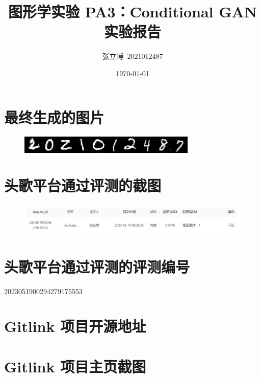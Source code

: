 \documentclass[12pt,a4paper]{article}
\title{\textbf{图形学实验 PA3：Conditional GAN 实验报告}}
\author{张立博\ 2021012487}
\date{\today}
\begin{document}
\maketitle
\section{最终生成的图片}
\begin{figure}[H]
    \centering
    \includegraphics*{result.png}
\end{figure}
\section{头歌平台通过评测的截图}
\begin{figure}[H]
    \centering
    \includegraphics*{evaluate.jpg}
\end{figure}
\section{头歌平台通过评测的评测编号}
2023051900294279175553
\section{Gitlink 项目开源地址}
\section{Gitlink 项目主页截图}
\end{document}
